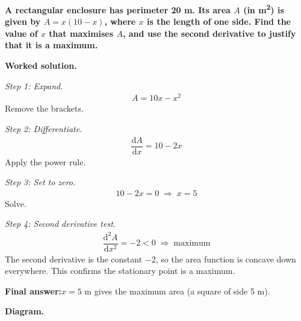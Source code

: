 \documentclass[11pt]{article}
\newcommand{\question}[1]{\par\medskip\noindent\textbf{#1}\par}
\begin{document}
\question{A rectangular enclosure has perimeter 20 m. Its area \( A \) (in m\textsuperscript{2}) is given by \( A = x(10 - x) \), where \( x \) is the length of one side. Find the value of \( x \) that maximises \( A \), and use the second derivative to justify that it is a maximum.}

\textbf{Worked solution.}

\textit{Step 1: Expand.}
\[\begin{gathered}
A = 10x - x^2
\end{gathered}\]
Remove the brackets.

\textit{Step 2: Differentiate.}
\[\begin{gathered}
\dfrac{\mathrm{d}A}{\mathrm{d}x} = 10 - 2x
\end{gathered}\]
Apply the power rule.

\textit{Step 3: Set to zero.}
\[\begin{gathered}
10 - 2x = 0 \;\Rightarrow\; x = 5
\end{gathered}\]
Solve.

\textit{Step 4: Second derivative test.}
\[\begin{gathered}
\dfrac{\mathrm{d}^2A}{\mathrm{d}x^2} = -2 < 0 \;\Rightarrow\; \text{maximum}
\end{gathered}\]
The second derivative is the constant \(-2\), so the area function is concave down everywhere. This confirms the stationary point is a maximum.

\begin{answerbox}
\textbf{Final answer:}\quad \(\displaystyle  x = 5 \) m gives the maximum area (a square of side 5 m).
\end{answerbox}
\textbf{Diagram.}
\end{document}
